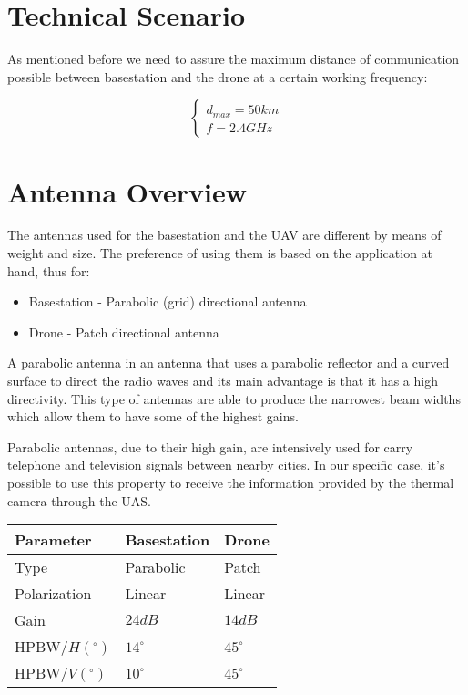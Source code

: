 \section*{Technical Scenario}
As mentioned before we need to assure the maximum distance of communication possible between basestation and the drone at a certain working frequency:

\begin{equation*}\label{eq:tech_parameters1} 
 	\begin{cases}
 		d_{max} = 50 km	\\
 		f = 2.4 GHz
 	\end{cases}
\end{equation*}

\section*{Antenna Overview}
The antennas used for the basestation and the UAV are different by means of weight and size. The preference of using them is based on the application at hand, thus for:
\begin{itemize}
	\item Basestation - Parabolic (grid) directional antenna 
	\item Drone - Patch directional antenna
\end{itemize}

A parabolic antenna in an antenna that uses a parabolic reflector and a curved surface to direct the radio waves and its main advantage is that it has a high directivity. This type of antennas are able to produce the narrowest beam widths which allow them to have some of the highest gains.

Parabolic antennas, due to their high gain, are intensively used for carry telephone and television signals between nearby cities. In our specific case, it’s possible to use this property to receive the information provided by the thermal camera through the UAS.

\begin{table}[h!]
\centering
	\begin{tabular}{|p{3cm}||p{3cm}|p{3cm}|}
		\centering
		\hline
		Parameter & Basestation & Drone\\ \hline
		Type & Parabolic & Patch\\ \hline
		Polarization & Linear & Linear\\ \hline
		Gain & $24dB$ & $14dB$\\ \hline
		HPBW/$H(^{\circ})$ & $14^{\circ}$ & $45^{\circ}$\\ \hline
		HPBW/$V(^{\circ})$ & $10^{\circ}$ & $45^{\circ}$\\ \hline
	\end{tabular}
\end{table}